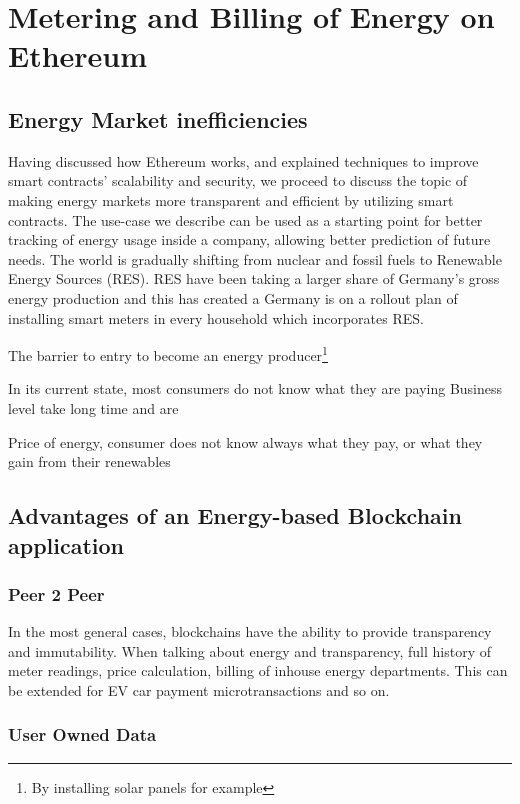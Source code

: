 \chapter{Metering and Billing of Energy on Ethereum}

\section{Energy Market inefficiencies}

Having discussed how Ethereum works, and explained techniques to improve smart contracts' scalability and security, we proceed to discuss the topic of making energy markets more transparent and efficient by utilizing smart contracts. The use-case we describe can be used as a starting point for better tracking of energy usage inside a company, allowing better prediction of future needs.  
The world is gradually shifting from nuclear and fossil fuels to Renewable Energy Sources (RES). RES have been taking a larger share of Germany's gross energy production and this has created a 
Germany is on a rollout plan of installing smart meters in every household which incorporates RES.  

The barrier to entry to become an energy producer\footnote{By installing solar panels for example} 

In its current state, most consumers do not know what they are paying Business level take long time and are 

Price of energy, consumer does not know always what they pay, or what they gain from their renewables
 
\section{Advantages of an Energy-based Blockchain application}

\subsection{Peer 2 Peer}
In the most general cases, blockchains have the ability to provide transparency and immutability. When talking about energy and transparency, full history of meter readings, price calculation, billing of inhouse energy departments. This can be extended for EV car payment microtransactions and so on.

\subsection{User Owned Data}

